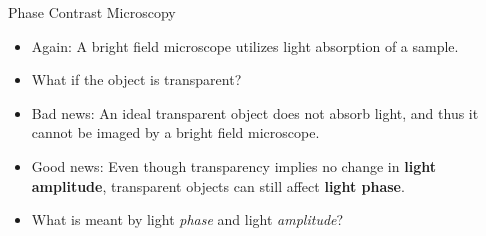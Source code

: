 \begin{frame}{Phase Contrast Microscopy}
	\begin{itemize}
		\item<1-> Again: A bright field microscope utilizes light absorption of a sample.
		\item<2-> What if the object is transparent?
		\item<3-> Bad news: An ideal transparent object does not absorb light, and thus it cannot be imaged by a bright field microscope.
		\item<4-> Good news: Even though transparency implies no change in \textbf{light amplitude}, transparent objects can still affect \textbf{light phase}.
		\item<5-> What is meant by light \textit{phase} and light \textit{amplitude}?
	\end{itemize}
\end{frame}
